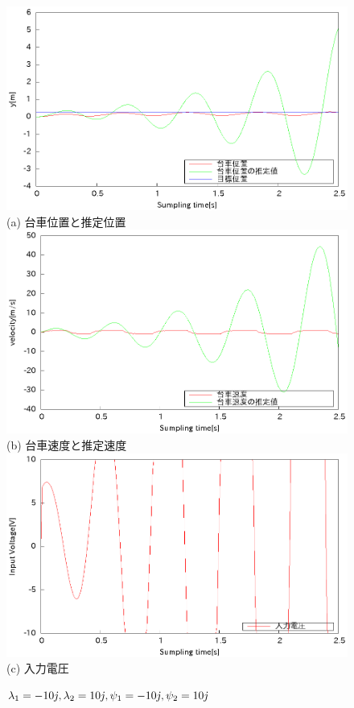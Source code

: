\documentclass[11pt,a4paper]{jsarticle}
\begin{document}
 \newpage
 \begin{figure}[H]
  \begin{center}
   \includegraphics[scale = .8]{./picture/exp7.eps} \\
   (a) 台車位置と推定位置 \\
   \includegraphics[scale = .8]{./picture/exp7_2.eps} \\
   (b) 台車速度と推定速度 \\
   \includegraphics[scale = .8]{./picture/exp7_3.eps} \\
   (c) 入力電圧
  \end{center}
  \caption{$\lambda_1 = -10{\it j},\lambda_2 = 10{\it j}, \psi_1 = -10{\it j},\psi_2 = 10{\it j}$}
 \end{figure}
\end{document}

